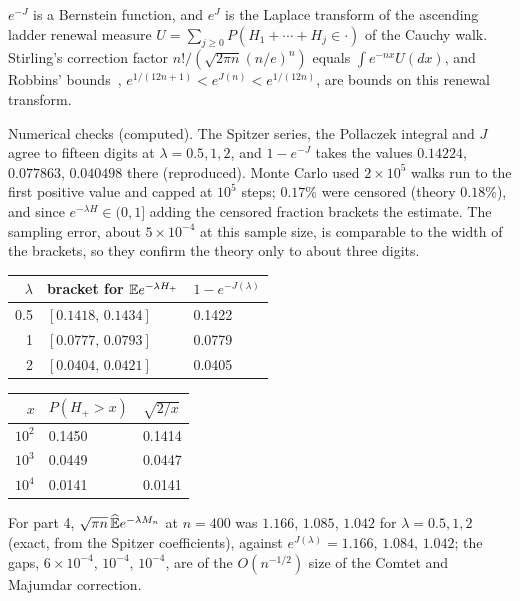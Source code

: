 \begin{corollary}[proved]\label{cw:cor:robbins}
$e^{-J}$ is a Bernstein function, and $e^{J}$ is the Laplace transform of the ascending ladder renewal measure $U=\sum_{j\ge0}P(H_1+\cdots+H_j\in\cdot)$ of the Cauchy walk. Stirling's correction factor $n!/(\sqrt{2\pi n}(n/e)^n)$ equals $\int e^{-nx}U(dx)$, and Robbins' bounds~\cite{Robbins55}, $e^{1/(12n+1)}<e^{J(n)}<e^{1/(12n)}$, are bounds on this renewal transform.
\end{corollary}

Numerical checks (computed). The Spitzer series, the Pollaczek integral and $J$ agree to fifteen digits at $\lambda=0.5,1,2$, and $1-e^{-J}$ takes the values $0.14224$, $0.077863$, $0.040498$ there (reproduced). Monte Carlo used $2\times10^5$ walks run to the first positive value and capped at $10^5$ steps; $0.17\%$ were censored (theory $0.18\%$), and since $e^{-\lambda H}\in(0,1]$ adding the censored fraction brackets the estimate. The sampling error, about $5\times10^{-4}$ at this sample size, is comparable to the width of the brackets, so they confirm the theory only to about three digits.
\begin{center}
\small
\begin{tabular}{rll}
\toprule
$\lambda$ & bracket for $\mathbb{E} e^{-\lambda H_+}$ & $1-e^{-J(\lambda)}$\\
\midrule
0.5 & $[0.1418,\,0.1434]$ & 0.1422\\
1 & $[0.0777,\,0.0793]$ & 0.0779\\
2 & $[0.0404,\,0.0421]$ & 0.0405\\
\bottomrule
\end{tabular}
\quad
\begin{tabular}{rll}
\toprule
$x$ & $P(H_+>x)$ & $\sqrt{2/x}$\\
\midrule
$10^2$ & 0.1450 & 0.1414\\
$10^3$ & 0.0449 & 0.0447\\
$10^4$ & 0.0141 & 0.0141\\
\bottomrule
\end{tabular}
\end{center}
For part 4, $\sqrt{\pi n}\,\widehat{\mathbb{E}} e^{-\lambda M_n}$ at $n=400$ was $1.166$, $1.085$, $1.042$ for $\lambda=0.5,1,2$ (exact, from the Spitzer coefficients), against $e^{J(\lambda)}=1.166$, $1.084$, $1.042$; the gaps, $6\times10^{-4}$, $10^{-4}$, $10^{-4}$, are of the $O(n^{-1/2})$ size of the Comtet and Majumdar correction.

